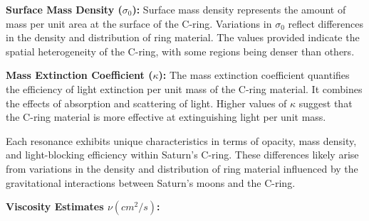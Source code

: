 \documentclass{article}
\begin{document}
\textbf{Surface Mass Density ($\sigma_{0}$):}
Surface mass density represents the amount of mass per unit area at the surface of the C-ring. Variations in $\sigma_{0}$ reflect differences in the density and distribution of ring material. The values provided indicate the spatial heterogeneity of the C-ring, with some regions being denser than others.

\textbf{Mass Extinction Coefficient ($\kappa$):}
The mass extinction coefficient quantifies the efficiency of light extinction per unit mass of the C-ring material. It combines the effects of absorption and scattering of light. Higher values of $\kappa$ suggest that the C-ring material is more effective at extinguishing light per unit mass.


Each resonance exhibits unique characteristics in terms of opacity, mass density, and light-blocking efficiency within Saturn's C-ring. These differences likely arise from variations in the density and distribution of ring material influenced by the gravitational interactions between Saturn's moons and the C-ring.


\textbf{Viscosity Estimates $\nu(cm^{2}/s)$:}




\end{document}
